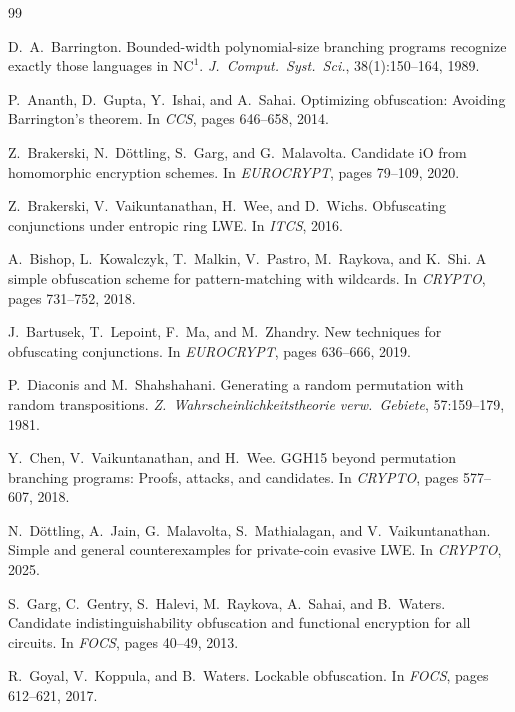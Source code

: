 \documentclass[11pt]{article}
\begin{document}
\begin{thebibliography}{99}

D.~A.~Barrington.
\newblock Bounded-width polynomial-size branching programs recognize exactly
  those languages in $\mathrm{NC}^1$.
\newblock \emph{J.~Comput.~Syst.~Sci.}, 38(1):150--164, 1989.

P.~Ananth, D.~Gupta, Y.~Ishai, and A.~Sahai.
\newblock Optimizing obfuscation: Avoiding Barrington's theorem.
\newblock In \emph{CCS}, pages 646--658, 2014.

Z.~Brakerski, N.~D{\"o}ttling, S.~Garg, and G.~Malavolta.
\newblock Candidate iO from homomorphic encryption schemes.
\newblock In \emph{EUROCRYPT}, pages 79--109, 2020.

Z.~Brakerski, V.~Vaikuntanathan, H.~Wee, and D.~Wichs.
\newblock Obfuscating conjunctions under entropic ring LWE.
\newblock In \emph{ITCS}, 2016.

A.~Bishop, L.~Kowalczyk, T.~Malkin, V.~Pastro, M.~Raykova, and K.~Shi.
\newblock A simple obfuscation scheme for pattern-matching with wildcards.
\newblock In \emph{CRYPTO}, pages 731--752, 2018.

J.~Bartusek, T.~Lepoint, F.~Ma, and M.~Zhandry.
\newblock New techniques for obfuscating conjunctions.
\newblock In \emph{EUROCRYPT}, pages 636--666, 2019.

P.~Diaconis and M.~Shahshahani.
\newblock Generating a random permutation with random transpositions.
\newblock \emph{Z.~Wahrscheinlichkeitstheorie verw.~Gebiete}, 57:159--179, 1981.

Y.~Chen, V.~Vaikuntanathan, and H.~Wee.
\newblock GGH15 beyond permutation branching programs: Proofs, attacks, and
  candidates.
\newblock In \emph{CRYPTO}, pages 577--607, 2018.

N.~D{\"o}ttling, A.~Jain, G.~Malavolta, S.~Mathialagan, and
  V.~Vaikuntanathan.
\newblock Simple and general counterexamples for private-coin evasive LWE.
\newblock In \emph{CRYPTO}, 2025.

S.~Garg, C.~Gentry, S.~Halevi, M.~Raykova, A.~Sahai, and B.~Waters.
\newblock Candidate indistinguishability obfuscation and functional encryption
  for all circuits.
\newblock In \emph{FOCS}, pages 40--49, 2013.

R.~Goyal, V.~Koppula, and B.~Waters.
\newblock Lockable obfuscation.
\newblock In \emph{FOCS}, pages 612--621, 2017.


\end{thebibliography}
\end{document}
